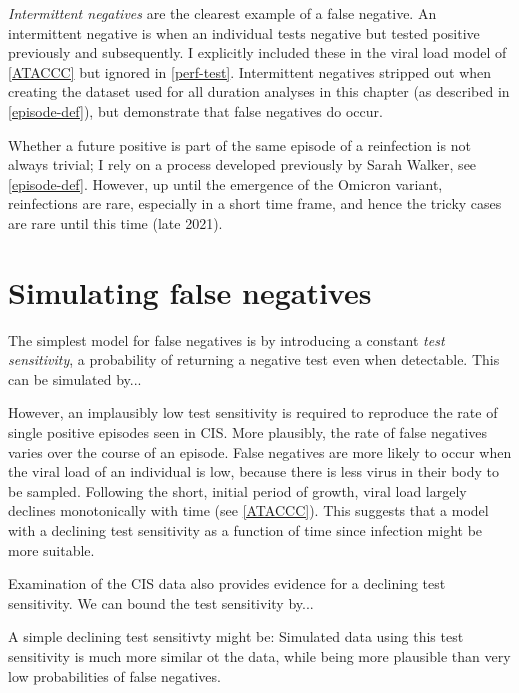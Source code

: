 \documentclass[thesis.tex]{subfiles}
\begin{document}
\emph{Intermittent negatives} are the clearest example of a false negative.
An intermittent negative is when an individual tests negative but tested positive previously and subsequently.
I explicitly included these in the viral load model of \cref{ATACCC} but ignored in \cref{perf-test}.
Intermittent negatives stripped out when creating the dataset used for all duration analyses in this chapter (as described in \cref{episode-def}), but demonstrate that false negatives do occur.

Whether a future positive is part of the same episode of a reinfection is not always trivial; I rely on a process developed previously by Sarah Walker, see \cref{episode-def}.
However, up until the emergence of the Omicron variant, reinfections are rare, especially in a short time frame, and hence the tricky cases are rare until this time (late 2021).

\section{Simulating false negatives} \label{imperf-test:sec:simulate}

The simplest model for false negatives is by introducing a constant \emph{test sensitivity}, a probability of returning a negative test even when detectable.
This can be simulated by...

However, an implausibly low test sensitivity is required to reproduce the rate of single positive episodes seen in CIS.
More plausibly, the rate of false negatives varies over the course of an episode.
False negatives are more likely to occur when the viral load of an individual is low, because there is less virus in their body to be sampled.
Following the short, initial period of growth, viral load largely declines monotonically with time (see \cref{ATACCC}).
This suggests that a model with a declining test sensitivity as a function of time since infection might be more suitable.

Examination of the CIS data also provides evidence for a declining test sensitivity.
We can bound the test sensitivity by...

A simple declining test sensitivty might be:
Simulated data using this test sensitivity is much more similar ot the data, while being more plausible than very low probabilities of false negatives.
\end{document}
